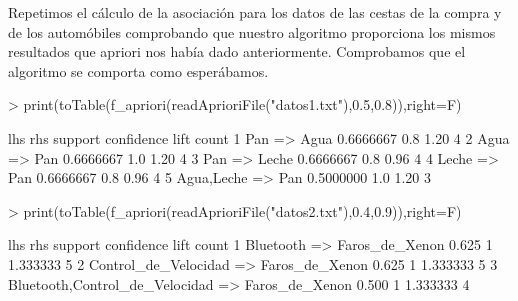 \documentclass [a4paper] {article}
\begin{document}
Repetimos el cálculo de la asociación para los datos de las cestas de la compra y de los automóbiles comprobando que nuestro algoritmo proporciona
los mismos resultados que apriori nos había dado anteriormente. Comprobamos que el algoritmo se comporta como esperábamos.
\begin{Schunk}
\begin{Sinput}
> print(toTable(f_apriori(readAprioriFile("datos1.txt"),0.5,0.8)),right=F)
\end{Sinput}
\begin{Soutput}
  lhs             rhs     support   confidence lift count
1 {Pan}        => {Agua}  0.6666667 0.8        1.20 4    
2 {Agua}       => {Pan}   0.6666667 1.0        1.20 4    
3 {Pan}        => {Leche} 0.6666667 0.8        0.96 4    
4 {Leche}      => {Pan}   0.6666667 0.8        0.96 4    
5 {Agua,Leche} => {Pan}   0.5000000 1.0        1.20 3    
\end{Soutput}
\begin{Sinput}
> print(toTable(f_apriori(readAprioriFile("datos2.txt"),0.4,0.9)),right=F)
\end{Sinput}
\begin{Soutput}
  lhs                                 rhs              support confidence lift     count
1 {Bluetooth}                      => {Faros_de_Xenon} 0.625   1          1.333333 5    
2 {Control_de_Velocidad}           => {Faros_de_Xenon} 0.625   1          1.333333 5    
3 {Bluetooth,Control_de_Velocidad} => {Faros_de_Xenon} 0.500   1          1.333333 4    
\end{Soutput}
\end{Schunk}
\end{document}
